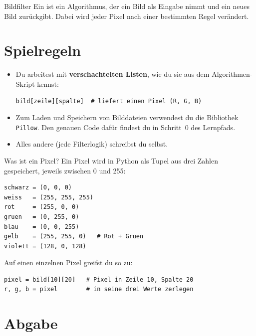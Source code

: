 \begin{definitionbox}{Bildfilter}
Ein  ist ein Algorithmus, der ein Bild als Eingabe nimmt
und ein neues Bild zur\"uckgibt. Dabei wird jeder Pixel nach einer
bestimmten Regel ver\"andert.
\end{definitionbox}

\section{Spielregeln}

\begin{itemize}
  \item Du arbeitest mit \textbf{verschachtelten Listen}, wie du sie aus
    dem Algorithmen-Skript kennst:
\begin{lstlisting}
bild[zeile][spalte]  # liefert einen Pixel (R, G, B)
\end{lstlisting}
  \item Zum Laden und Speichern von Bilddateien verwendest du die
    Bibliothek \texttt{Pillow}. Den genauen Code daf\"ur findest du in
    Schritt~0 des Lernpfads.
  \item Alles andere (jede Filterlogik) schreibst du selbst.
\end{itemize}

\begin{beispiel}{Was ist ein Pixel?}
Ein Pixel wird in Python als Tupel aus drei Zahlen gespeichert, jeweils
zwischen 0 und 255:

\begin{lstlisting}
schwarz = (0, 0, 0)
weiss   = (255, 255, 255)
rot     = (255, 0, 0)
gruen   = (0, 255, 0)
blau    = (0, 0, 255)
gelb    = (255, 255, 0)   # Rot + Gruen
violett = (128, 0, 128)
\end{lstlisting}

Auf einen einzelnen Pixel greifst du so zu:
\begin{lstlisting}
pixel = bild[10][20]   # Pixel in Zeile 10, Spalte 20
r, g, b = pixel        # in seine drei Werte zerlegen
\end{lstlisting}
\end{beispiel}

\section{Abgabe}


